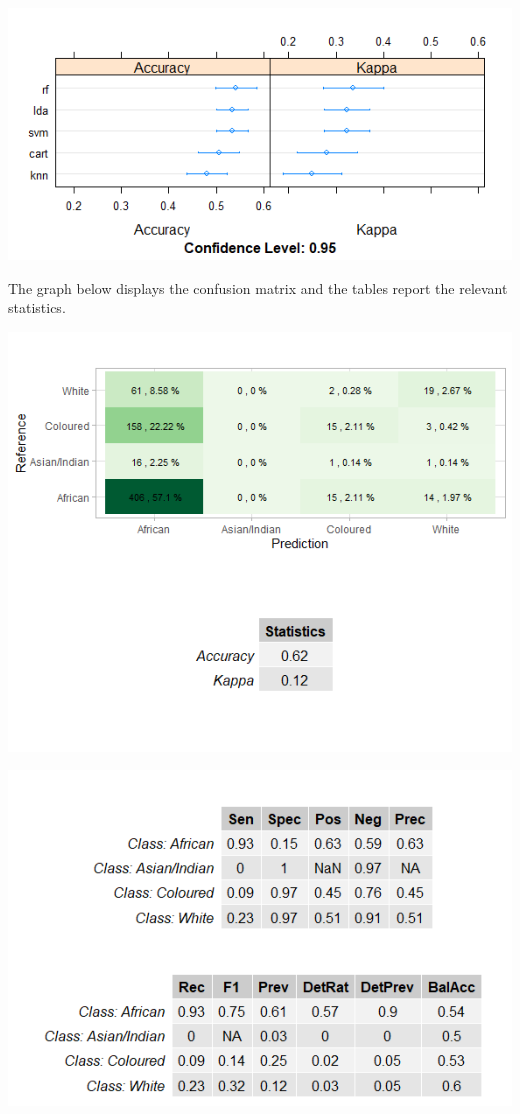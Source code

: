 \documentclass[11pt,preprint, authoryear]{elsarticle}
\let\origfigure\figure
\let\endorigfigure\endfigure
\renewenvironment{figure}[1][2] {
    \expandafter\origfigure\expandafter[H]
} {
    \endorigfigure
}
\numberwithin{equation}{section}
\numberwithin{figure}{section}
\numberwithin{table}{section}
\begin{document}
\begin{figure}
\centering
\includegraphics{"images/bal2.png"}
\caption{Machine Learning applied to balanced data}
\end{figure}

The graph below displays the confusion matrix and the tables report the
relevant statistics.

\begin{figure}
\centering
\includegraphics{"images/cmrf.png"}
\caption{Random Forest Confusion Matrix}
\end{figure}

\begin{figure}
\centering
\includegraphics{"images/statsrf.png"}
\caption{Random Forest Statistics}
\end{figure}
\end{document}
